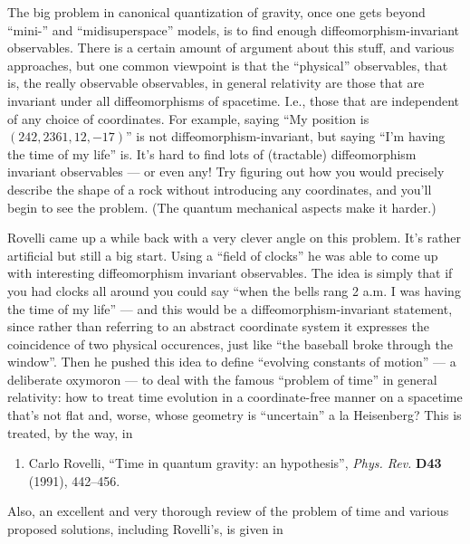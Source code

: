 \documentclass{article}
\def\tightlist{}
\renewcommand{\texttt}[1]{%
  \begingroup
  \ttfamily
  \begingroup\lccode`~=`/\lowercase{\endgroup\def~}{/\discretionary{}{}{}}%
  \begingroup\lccode`~=`[\lowercase{\endgroup\def~}{[\discretionary{}{}{}}%
  \begingroup\lccode`~=`.\lowercase{\endgroup\def~}{.\discretionary{}{}{}}%
  \catcode`/=\active\catcode`[=\active\catcode`.=\active
  \scantokens{#1\noexpand}%
  \endgroup
}
\begin{document}
The big problem in canonical quantization of gravity, once one gets
beyond ``mini-'' and ``midisuperspace'' models, is to find enough
diffeomorphism-invariant observables. There is a certain amount of
argument about this stuff, and various approaches, but one common
viewpoint is that the ``physical'' observables, that is, the really
observable observables, in general relativity are those that are
invariant under all diffeomorphisms of spacetime. I.e., those that are
independent of any choice of coordinates. For example, saying ``My
position is \((242,2361,12,-17)\)'' is not diffeomorphism-invariant, but
saying ``I'm having the time of my life'' is. It's hard to find lots of
(tractable) diffeomorphism invariant observables --- or even any! Try
figuring out how you would precisely describe the shape of a rock
without introducing any coordinates, and you'll begin to see the
problem. (The quantum mechanical aspects make it harder.)

Rovelli came up a while back with a very clever angle on this problem.
It's rather artificial but still a big start. Using a ``field of
clocks'' he was able to come up with interesting diffeomorphism
invariant observables. The idea is simply that if you had clocks all
around you could say ``when the bells rang 2 a.m. I was having the time
of my life'' --- and this would be a diffeomorphism-invariant statement,
since rather than referring to an abstract coordinate system it
expresses the coincidence of two physical occurences, just like ``the
baseball broke through the window''. Then he pushed this idea to define
``evolving constants of motion'' --- a deliberate oxymoron --- to deal
with the famous ``problem of time'' in general relativity: how to treat
time evolution in a coordinate-free manner on a spacetime that's not
flat and, worse, whose geometry is ``uncertain'' a la Heisenberg? This
is treated, by the way, in

\begin{enumerate}
\def\labelenumi{\arabic{enumi})}
\setcounter{enumi}{2}
\tightlist
\item
  Carlo Rovelli, ``Time in quantum gravity: an hypothesis'', \emph{Phys.
  Rev.} \textbf{D43} (1991), 442--456.
\end{enumerate}

Also, an excellent and very thorough review of the problem of time and
various proposed solutions, including Rovelli's, is given in

\end{document}
